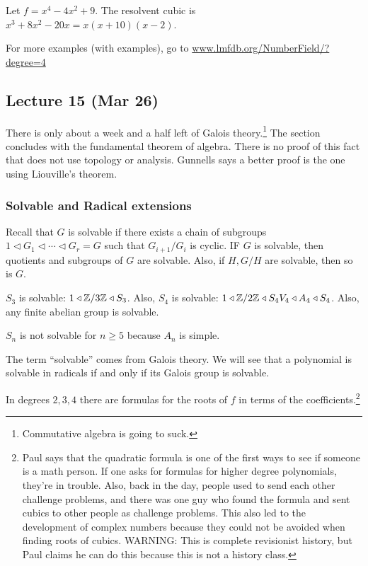 \message{ !name(notes.tex)}\documentclass[10pt, twoside]{article}
\begin{document}
        \begin{exm}
            Let $f = x^4 - 4x^2 + 9$. The resolvent cubic is $x^3+8x^2-20x = x(x+10)(x-2)$.
        \end{exm}

        \begin{exm}
            For more examples (with examples), go to \url{www.lmfdb.org/NumberField/?degree=4}
        \end{exm}

        \subsection{Lecture 15 (Mar 26)}
        There is only about a week and a half left of Galois theory.\footnote{Commutative algebra is going to suck.} The section concludes with the fundamental theorem of algebra. There is no proof of this fact that does not use topology or analysis. Gunnells says a better proof is the one using Liouville's theorem.
        
        \subsubsection{Solvable and Radical extensions}
        Recall that $G$ is solvable if there exists a chain of subgroups $1 \triangleleft G_1 \triangleleft \cdots \triangleleft G_r = G$ such that $G_{i+1}/G_i$ is cyclic. IF $G$ is solvable, then quotients and subgroups of $G$ are solvable. Also, if $H,G/H$ are solvable, then so is $G$.

        \begin{exm}
            $S_3$ is solvable: $1 \triangleleft \mathbb{Z}/3\mathbb{Z} \triangleleft S_3$. Also, $S_4$ is solvable: $1 \triangleleft \mathbb{Z}/2\mathbb{Z} \triangleleft S_4 V_4 \triangleleft A_4 \triangleleft S_4$. Also, any finite abelian group is solvable.
        \end{exm}

        \begin{exm}
            $S_n$ is not solvable for $n \geq 5$ because $A_n$ is simple.
        \end{exm}

        The term ``solvable'' comes from Galois theory. We will see that a polynomial is solvable in radicals if and only if its Galois group is solvable.

        \begin{exm}
            In degrees $2,3,4$ there are formulas for the roots of $f$ in terms of the coefficients.\footnote{Paul says that the quadratic formula is one of the first ways to see if someone is a math person. If one asks for formulas for higher degree polynomials, they're in trouble. Also, back in the day, people used to send each other challenge problems, and there was one guy who found the formula and sent cubics to other people as challenge problems. This also led to the development of complex numbers because they could not be avoided when finding roots of cubics. WARNING: This is complete revisionist history, but Paul claims he can do this because this is not a history class.}
        \end{exm}
        
\end{document}
